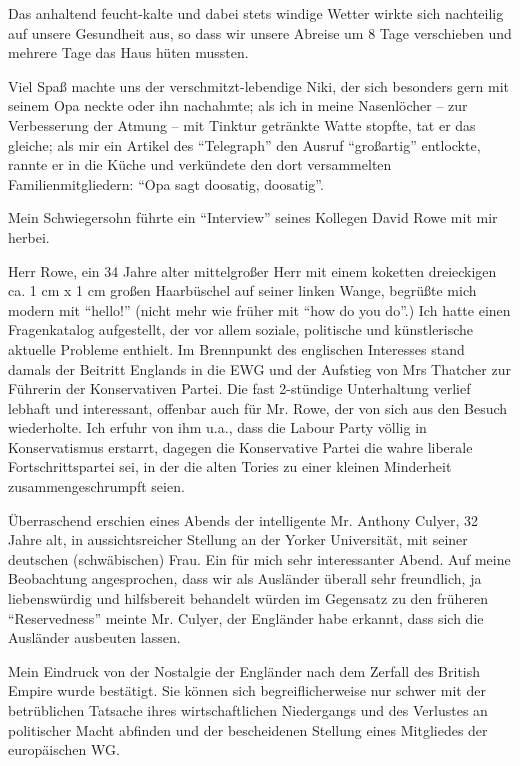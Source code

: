 \documentclass[a5paper,pagesize,10pt,twoside=true]{scrbook}
\begin{document}
Das anhaltend feucht-kalte und dabei stets windige Wetter wirkte sich nachteilig auf unsere Gesundheit aus, so dass wir unsere Abreise um 8 Tage verschieben und mehrere Tage das Haus hüten mussten.

Viel Spaß machte uns der verschmitzt-lebendige Niki, der sich besonders gern mit seinem Opa neckte oder ihn nachahmte; als ich in meine Nasenlöcher -- zur Verbesserung der Atmung -- mit Tinktur getränkte Watte stopfte, tat er das gleiche; als mir ein Artikel des \enquote{Telegraph} den Ausruf \enquote{großartig} entlockte, rannte er in die Küche und verkündete den dort versammelten Familienmitgliedern: \enquote{Opa sagt doosatig, doosatig}.

Mein Schwiegersohn führte ein \enquote{Interview} seines Kollegen David Rowe mit mir herbei.

Herr Rowe, ein 34 Jahre alter mittelgroßer Herr mit einem koketten dreieckigen ca. 1 cm x 1 cm großen Haarbüschel auf seiner linken Wange, begrüßte mich modern mit \enquote{hello!} (nicht mehr wie früher mit \enquote{how do you do}.) Ich hatte einen Fragenkatalog aufgestellt, der vor allem soziale, politische und künstlerische aktuelle Probleme enthielt. Im Brennpunkt des englischen Interesses stand damals der Beitritt Englands in die EWG und der Aufstieg von Mrs Thatcher zur Führerin der Konservativen Partei. Die fast 2-stündige Unterhaltung verlief lebhaft und interessant, offenbar auch für Mr. Rowe, der von sich aus den Besuch wiederholte. Ich erfuhr von ihm u.a., dass die Labour Party völlig in Konservatismus erstarrt, dagegen die Konservative Partei die wahre liberale Fortschrittspartei sei, in der die alten Tories zu einer kleinen Minderheit zusammengeschrumpft seien.

Überraschend erschien eines Abends der intelligente Mr. Anthony Culyer, 32 Jahre alt, in aussichtsreicher Stellung an der Yorker Universität, mit seiner deutschen (schwäbischen) Frau. Ein für mich sehr interessanter Abend. Auf meine Beobachtung angesprochen, dass wir als Ausländer überall sehr freundlich, ja liebenswürdig und hilfsbereit behandelt würden im Gegensatz zu den früheren \enquote{Reservedness} meinte Mr. Culyer, der Engländer habe erkannt, dass sich die Ausländer ausbeuten lassen.

Mein Eindruck von der Nostalgie der Engländer nach dem Zerfall des British Empire wurde bestätigt. Sie können sich begreiflicherweise nur schwer mit der betrüblichen Tatsache ihres wirtschaftlichen Niedergangs und des Verlustes an politischer Macht abfinden und der bescheidenen Stellung eines Mitgliedes der europäischen WG.
\end{document}
